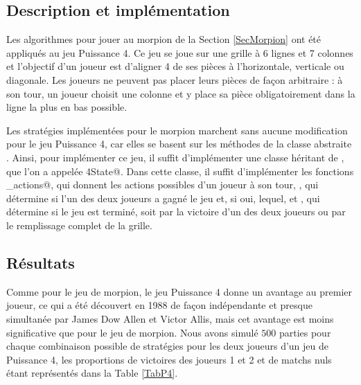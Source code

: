 \documentclass[a4paper,12pt]{article}
\begin{document}
\subsection{Description et implémentation}

Les algorithmes pour jouer au morpion de la Section \ref{SecMorpion} ont été appliqués au jeu Puissance 4. Ce jeu se joue sur une grille à 6 lignes et 7 colonnes et l'objectif d'un joueur est d'aligner 4 de ses pièces à l'horizontale, verticale ou diagonale. Les joueurs ne peuvent pas placer leurs pièces de façon arbitraire : à son tour, un joueur choisit une colonne et y place sa pièce obligatoirement dans la ligne la plus en bas possible.

Les stratégies implémentées pour le morpion marchent sans aucune modification pour le jeu Puissance 4, car elles se basent sur les méthodes de la classe abstraite \verb@State@. Ainsi, pour implémenter ce jeu, il suffit d'implémenter une classe héritant de \verb@State@, que l'on a appelée \verb@Puissance4State@. Dans cette classe, il suffit d'implémenter les fonctions \verb@get_actions@, qui donnent les actions possibles d'un joueur à son tour, \verb@win@, qui détermine si l'un des deux joueurs a gagné le jeu et, si oui, lequel, et \verb@stop@, qui détermine si le jeu est terminé, soit par la victoire d'un des deux joueurs ou par le remplissage complet de la grille.

\subsection{Résultats}

Comme pour le jeu de morpion, le jeu Puissance 4 donne un avantage au premier joueur, ce qui a été découvert en 1988 de façon indépendante et presque simultanée par James Dow Allen et Victor Allis, mais cet avantage est moins significative que pour le jeu de morpion. Nous avons simulé $500$ parties pour chaque combinaison possible de stratégies pour les deux joueurs d'un jeu de Puissance 4, les proportions de victoires des joueurs 1 et 2 et de matchs nuls étant représentés dans la Table \ref{TabP4}.
\end{document}
